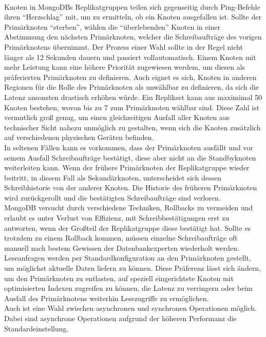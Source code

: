 \paragraph{}
Knoten in MongoDBs Replikatgruppen teilen sich gegenseitig durch Ping-Befehle ihren \enquote{Herzschlag} mit, um zu ermitteln, ob ein Knoten ausgefallen ist.
Sollte der Primärknoten \enquote{sterben}, wählen die \enquote{überlebenden} Knoten in einer Abstimmung den nächsten Primärknoten, welcher die Schreibaufträge des vorigen Primärknotens übernimmt.
Der Prozess einer Wahl sollte in der Regel nicht länger als 12 Sekunden dauern und passiert vollautomatisch.
Einem Knoten mit mehr Leistung kann eine höhere Priorität zugewiesen werdem, um diesen als präferierten Primärknoten zu definieren.
Auch eignet es sich, Knoten in anderen Regionen für die Rolle des Primärknoten als unwählbar zu definieren, da sich die Latenz ansonsten drastisch erhöhen würde.
Ein Replikset kann aus maximimal 50 Knoten bestehen, wovon bis zu 7 zum Primärknoten wählbar sind. \cite{MG3} \cite{MG4}
Diese Zahl ist vermutlich groß genug, um einen gleichzeitigen Ausfall aller Knoten aus technischer Sicht nahezu unmöglich zu gestalten, wenn sich die Knoten zusätzlich auf verschiedenen physischen Geräten befinden.\\
In seltenen Fällen kann es vorkommen, dass der Primärknoten ausfällt und vor seinem Ausfall Schreibaufträge bestätigt, diese aber nicht an die Standbyknoten weiterleiten kann. Wenn der frühere Primärknoten der Replikatgruppe wieder beitritt, in diesem Fall als Sekundärknoten, unterscheidet sich dessen Schreibhistorie von der anderer Knoten. Die Historie des früheren Primärknoten wird zurückgerollt und die bestätigten Schreibaufträge sind verloren.\\
MongoDB versucht durch verschiedene Techniken, Rollbacks zu vermeiden und erlaubt es unter Verlust von Effizienz, mit Schreibbestätigungen erst zu antworten, wenn der Großteil der Replikatgruppe diese bestätigt hat.
Sollte es trotzdem zu einem Rollback kommen, müssen einzelne Schreibaufträge oft manuell nach bestem Gewissen der Datenbankexperten wiederholt werden. \cite{MG5}\\
Leseanfragen werden per Standardkonfiguration an den Primärknoten gestellt, um möglichst aktuelle Daten liefern zu können.
Diese Präferenz lässt sich ändern, um den Primärknoten zu entlasten, auf speziell eingerichtete Knoten mit optimisierten Indexen zugreifen zu können, die Latenz zu verringern oder beim Ausfall des Primärknotens weiterhin Lesezugriffe zu ermöglichen. \\
Auch ist eine Wahl zwischen asynchronen und synchronen Operationen möglich.
Dabei sind asynchrone Operationen aufgrund der höheren Performanz die Standardeinstellung.


